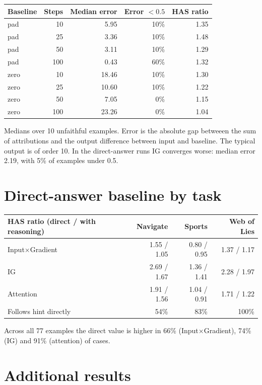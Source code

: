 \documentclass[10pt,a4paper,twocolumn]{article}
\newcommand{\ixg}{Input$\times$Gradient}
\begin{document}
\begin{center}\footnotesize
\begin{tabular}{@{}lrrrr@{}}
\toprule
Baseline & Steps & Median error & Error $<0.5$ & HAS ratio \\
\midrule
pad & 10 & 5.95 & 10\% & 1.35 \\
pad & 25 & 3.36 & 10\% & 1.48 \\
pad & 50 & 3.11 & 10\% & 1.29 \\
pad & 100 & 0.43 & 60\% & 1.32 \\
zero & 10 & 18.46 & 10\% & 1.30 \\
zero & 25 & 10.60 & 10\% & 1.22 \\
zero & 50 & 7.05 & 0\% & 1.15 \\
zero & 100 & 23.26 & 0\% & 1.04 \\
\bottomrule
\end{tabular}
\end{center}
Medians over 10 unfaithful examples. Error is the absolute gap betweeen the sum of attributions and the output difference between input and baseline. The typical output is of order 10. In the direct-answer runs IG converges worse: median error 2.19, with 5\% of examples under 0.5.

\section{Direct-answer baseline by task}
\label{app:direct}

\begin{center}\footnotesize
\setlength{\tabcolsep}{4pt}
\begin{tabular}{@{}lrrr@{}}
\toprule
HAS ratio (direct / with reasoning) & Navigate & Sports & Web of Lies \\
\midrule
\ixg & 1.55 / 1.05 & 0.80 / 0.95 & 1.37 / 1.17 \\
IG & 2.69 / 1.67 & 1.36 / 1.41 & 2.28 / 1.97 \\
Attention & 1.91 / 1.56 & 1.04 / 0.91 & 1.71 / 1.22 \\
Follows hint directly & 54\% & 83\% & 100\% \\
\bottomrule
\end{tabular}
\end{center}
Across all 77 examples the direct value is higher in 66\% (\ixg), 74\% (IG) and 91\% (attention) of cases.

\section{Additional results}
\label{app:more}
\end{document}
